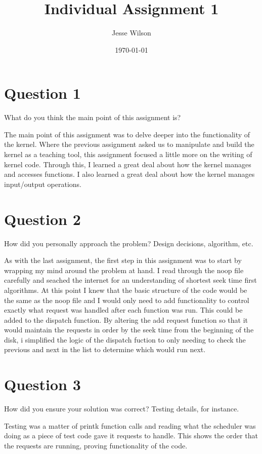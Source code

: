 \documentclass[a4paper]{article}
\title{Individual Assignment 1}
\author{Jesse Wilson}
\date{\today}
\begin{document}
\maketitle


\section{Question 1}

What do you think the main point of this assignment is?


The main point of this assignment was to delve deeper into the functionality of the kernel. Where the previous assignment asked us to manipulate and build the kernel as a teaching tool, this assignment focused a little more on the writing of kernel code. Through this, I learned a great deal about how the kernel manages and accesses functions. I also learned a great deal about how the kernel manages input/output operations. 

\section{Question 2}

How did you personally approach the problem? Design decisions, algorithm, etc.


As with the last assignment, the first step in this assignment was to start by wrapping my mind around the problem at hand. I read through the noop file carefully and seached the internet for an understanding of shortest seek time first algorithms. At this point I knew that the basic structure of the code would be the same as the noop file and I would only need to add functionality to control exactly what request was handled after each function was run. This could be added to the dispatch function. By altering the add request function so that it would maintain the requests in order by the seek time from the beginning of the disk, i simplified the logic of the dispatch fuction to only needing to check the previous and next in the list to determine which would run next. 

\section{Question 3}

How did you ensure your solution was correct? Testing details, for instance.


Testing was a matter of printk function calls and reading what the scheduler was doing as a piece of test code gave it requests to handle. This shows the order that the requests are running, proving functionality of the code.
\end{document}
